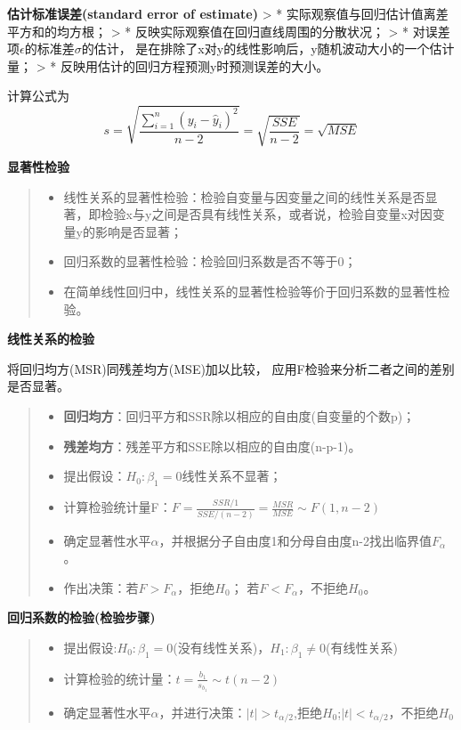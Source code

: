 \documentclass[]{ctexbook}
\providecommand{\tightlist}{%
  \setlength{\itemsep}{0pt}\setlength{\parskip}{0pt}}
\begin{document}
\textbf{估计标准误差(standard error of estimate)}
\textgreater{} * 实际观察值与回归估计值离差平方和的均方根；
\textgreater{} * 反映实际观察值在回归直线周围的分散状况；
\textgreater{} * 对误差项\(\epsilon\)的标准差\(\sigma\)的估计， 是在排除了x对y的线性影响后，y随机波动大小的一个估计量；
\textgreater{} * 反映用估计的回归方程预测y时预测误差的大小。

计算公式为
\[s=\sqrt{\frac{\sum_{i=1}^n(y_i-\hat y_i)^2}{n-2}}=\sqrt{\frac{SSE}{n-2}}=\sqrt{MSE}\]

\textbf{显著性检验}

\begin{quote}
\begin{itemize}
\tightlist
\item
  线性关系的显著性检验：检验自变量与因变量之间的线性关系是否显著，即检验x与y之间是否具有线性关系，或者说，检验自变量x对因变量y的影响是否显著；
\item
  回归系数的显著性检验：检验回归系数是否不等于0；
\item
  在简单线性回归中，线性关系的显著性检验等价于回归系数的显著性检验。
\end{itemize}
\end{quote}

\textbf{线性关系的检验}

将回归均方(MSR)同残差均方(MSE)加以比较， 应用F检验来分析二者之间的差别是否显著。

\begin{quote}
\begin{itemize}
\tightlist
\item
  \textbf{回归均方}：回归平方和SSR除以相应的自由度(自变量的个数p)；
\item
  \textbf{残差均方}：残差平方和SSE除以相应的自由度(n-p-1)。
\item
  提出假设：\(H_0:\beta_1=0\)线性关系不显著；
\item
  计算检验统计量F：\(F=\frac{SSR/1}{SSE/(n-2)}=\frac{MSR}{MSE}\sim F(1,n-2)\)
\item
  确定显著性水平\(\alpha\)，并根据分子自由度1和分母自由度n-2找出临界值\(F_\alpha\)。
\item
  作出决策：若\(F>F_\alpha\)，拒绝\(H_0\)； 若\(F<F_\alpha\)，不拒绝\(H_0\)。
\end{itemize}
\end{quote}

\textbf{回归系数的检验(检验步骤)}

\begin{quote}
\begin{itemize}
\tightlist
\item
  提出假设:\(H_0:\beta_1=0\)(没有线性关系)，\(H_1:\beta_1\neq 0\)(有线性关系)
\item
  计算检验的统计量：\(t=\frac{b_1}{s_{b_1}}\sim t(n-2)\)
\item
  确定显著性水平\(\alpha\)，并进行决策：\(|t|> t_{\alpha/2}\),拒绝\(H_0\);\(|t|< t_{\alpha/2}\)，不拒绝\(H_0\)
\end{itemize}
\end{quote}
\end{document}
